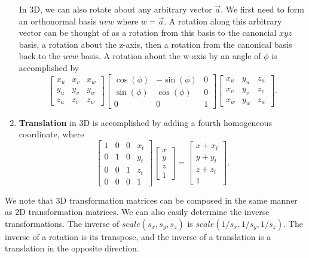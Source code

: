 \documentclass[11pt]{article}
\theoremstyle{plain} %
\theoremstyle{definition}
\theoremstyle{example}
\theoremstyle{remark}
\begin{document}
\begin{enumerate}
	In 3D, we can also rotate about any arbitrary vector $\vec{a}$. We first need to form an orthonormal basis $uvw$ where $w = \vec{a}$. A rotation along this arbitrary vector can be thought of as a rotation from this basis to the canoncial $xyz$ basis, a rotation about the z-axis, then a rotation from the canonical basis back to the $uvw$ basis. A rotation about the w-axis by an angle of $\phi$ is  accomplished by 
	$$\begin{bmatrix}x_u & x_v & x_w \\ y_u & y_v & y_w \\ z_u & z_v & z_w \end{bmatrix}\begin{bmatrix}\cos(\phi) &-\sin(\phi) & 0 \\ \sin(\phi) & \cos(\phi) & 0 \\ 0 & 0 & 1\end{bmatrix}\begin{bmatrix}x_u & y_u & z_u \\ x_v & y_v & z_v \\ x_w & y_w & z_w \end{bmatrix}.$$
	\item \textbf{Translation} in 3D is accomplished by adding a fourth homogeneous coordinate, where 
	$$\begin{bmatrix}1 & 0 & 0 & x_t \\ 0 & 1 & 0 & y_t \\ 0 & 0 & 1 & z_t \\ 0 & 0 & 0 & 1\end{bmatrix}\begin{bmatrix}x \\ y\\ z\\1\end{bmatrix} = \begin{bmatrix}x + x_t \\ y + y_t \\ z+z_t \\ 1\end{bmatrix}.$$
\end{enumerate}

We note that 3D transformation matrices can be composed in the same manner as 2D transformation matrices. We can also easily determine the inverse transformations. The inverse of $scale(s_x,s_y,s_z)$ is $scale(1/s_x, 1/s_y, 1/s_z).$ The inverse of a rotation is its transpose, and the inverse of a translation is a translation in the opposite direction. 
 
\end{document}
